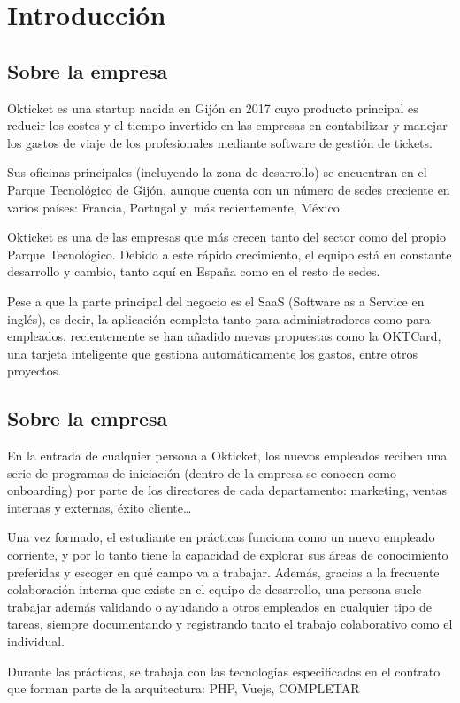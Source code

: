 \chapter{Introducción}
\section{Sobre la empresa}
Okticket es una startup nacida en Gijón en 2017 cuyo producto principal es reducir los costes
y el tiempo invertido en las empresas en contabilizar y manejar los gastos de viaje de los
profesionales mediante software de gestión de tickets.

Sus oficinas principales (incluyendo la zona de desarrollo) se encuentran en el Parque
Tecnológico de Gijón, aunque cuenta con un número de sedes creciente en varios países:
Francia, Portugal y, más recientemente, México.

Okticket es una de las empresas que más crecen tanto del sector como del propio Parque
Tecnológico. Debido a este rápido crecimiento, el equipo está en constante desarrollo y
cambio, tanto aquí en España como en el resto de sedes.

Pese a que la parte principal del negocio es el SaaS (Software as a Service en inglés),
es decir, la aplicación completa tanto para administradores como para empleados,
recientemente se han añadido nuevas propuestas como la OKTCard, una tarjeta inteligente
que gestiona automáticamente los gastos, entre otros proyectos.

\section{Sobre la empresa}
En la entrada de cualquier persona a Okticket, los nuevos empleados reciben una serie de
programas de iniciación (dentro de la empresa se conocen como onboarding) por parte de
los directores de cada departamento: marketing, ventas internas y externas, éxito cliente…

Una vez formado, el estudiante en prácticas funciona como un nuevo empleado corriente, y
por lo tanto tiene la capacidad de explorar sus áreas de conocimiento preferidas y escoger
en qué campo va a trabajar. Además, gracias a la frecuente colaboración interna que existe
en el equipo de desarrollo, una persona suele trabajar además validando o ayudando a otros
empleados en cualquier tipo de tareas, siempre documentando y registrando tanto el trabajo
colaborativo como el individual.

Durante las prácticas, se trabaja con las tecnologías especificadas en el contrato que
forman parte de la arquitectura: PHP, Vuejs, COMPLETAR

